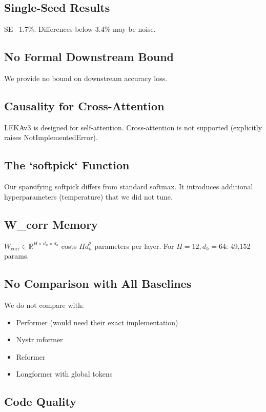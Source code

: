 \subsection{Single-Seed Results}

SE ~1.7\%. Differences below 3.4\% may be noise.

\subsection{No Formal Downstream Bound}

We provide no bound on downstream accuracy loss.

\subsection{Causality for Cross-Attention}

LEKAv3 is designed for self-attention. Cross-attention is not supported 
(explicitly raises NotImplementedError).

\subsection{The `softpick` Function}

Our sparsifying softpick differs from standard softmax. It introduces 
additional hyperparameters (temperature) that we did not tune.

\subsection{W\_corr Memory}

$W_\text{corr} \in \mathbb{R}^{H \times d_h \times d_h}$ costs 
$H d_h^2$ parameters per layer. For $H = 12, d_h = 64$: 49,152 params.

\subsection{No Comparison with All Baselines}

We do not compare with:
\begin{itemize}
\item Performer (would need their exact implementation)
\item Nystr mformer
\item Reformer
\item Longformer with global tokens

\end{itemize}
\subsection{Code Quality}

